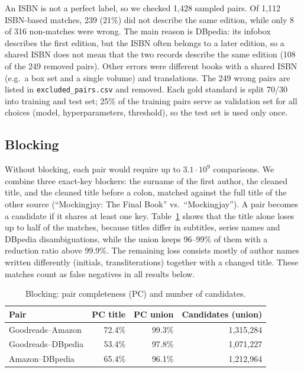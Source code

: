 \documentclass[runningheads]{llncs}
\begin{document}
An ISBN is not a perfect label, so we checked 1,428 sampled pairs. Of 1,112
ISBN-based matches, 239 (21\%) did not describe the same edition, while only 8
of 316 non-matches were wrong. The main reason is DBpedia: its infobox describes
the first edition, but the ISBN often belongs to a later edition, so a shared
ISBN does not mean that the two records describe the same edition (108 of the
249 removed pairs). Other errors were different books with a shared ISBN (e.g.\
a box set and a single volume) and translations. The 249 wrong pairs are listed
in \texttt{excluded\_pairs.csv} and removed. Each gold standard is split
70/30 into training and test set; 25\% of the training pairs serve as
validation set for all choices (model, hyperparameters, threshold), so the test
set is used only once.

\subsection{Blocking}\label{sec:blocking}
Without blocking, each pair would require up to $3.1\cdot10^9$ comparisons.
We combine three exact-key blockers: the surname of the first author, the
cleaned title, and the cleaned title before a colon, matched against the full
title of the other source (``Mockingjay: The Final Book'' vs.\
``Mockingjay''). A pair becomes a candidate if it shares at least one key.
Table~\ref{tab:blocking} shows that the title alone loses up to half of the
matches, because titles differ in subtitles, series names and DBpedia
disambiguations, while the union keeps 96--99\% of them with a reduction ratio
above 99.9\%. The remaining loss consists mostly of author names written
differently (initials, transliterations) together with a changed title. These
matches count as false negatives in all results below.

\begin{table}[htbp]
\centering
\caption{Blocking: pair completeness (PC) and number of candidates.}
\label{tab:blocking}
\footnotesize
\begin{tabular}{lrrr}
\toprule
\textbf{Pair} & \textbf{PC title} & \textbf{PC union} & \textbf{Candidates (union)} \\
\midrule
Goodreads--Amazon  & 72.4\% & 99.3\% & 1,315,284 \\
Goodreads--DBpedia & 53.4\% & 97.8\% & 1,071,227 \\
Amazon--DBpedia    & 65.4\% & 96.1\% & 1,212,964 \\
\bottomrule
\end{tabular}
\end{table}
\end{document}
